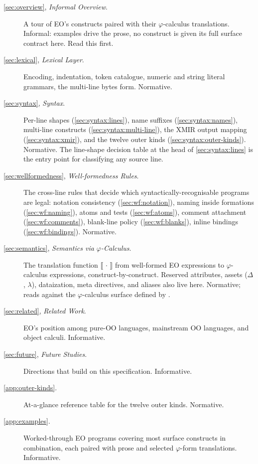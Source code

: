 \begin{description}
  \item[\cref{sec:overview}, \emph{Informal Overview}.]
    A tour of EO's constructs paired with their \(\varphi\)-calculus
    translations. Informal: examples drive the prose, no construct is
    given its full surface contract here. Read this first.
  \item[\cref{sec:lexical}, \emph{Lexical Layer}.]
    Encoding, indentation, token catalogue, numeric and string literal
    grammars, the multi-line bytes form. Normative.
  \item[\cref{sec:syntax}, \emph{Syntax}.]
    Per-line shapes (\cref{sec:syntax:lines}), name suffixes
    (\cref{sec:syntax:names}), multi-line constructs
    (\cref{sec:syntax:multi-line}), the XMIR output mapping
    (\cref{sec:syntax:xmir}), and the twelve outer kinds
    (\cref{sec:syntax:outer-kinds}). Normative.
    The line-shape decision table at the head of \cref{sec:syntax:lines}
    is the entry point for classifying any source line.
  \item[\cref{sec:wellformedness}, \emph{Well-formedness Rules}.]
    The cross-line rules that decide which syntactically-recognisable
    programs are legal: notation consistency
    (\cref{sec:wf:notation}), naming inside formations
    (\cref{sec:wf:naming}), atoms and tests (\cref{sec:wf:atoms}),
    comment attachment (\cref{sec:wf:comments}), blank-line policy
    (\cref{sec:wf:blanks}), inline bindings (\cref{sec:wf:bindings}).
    Normative.
  \item[\cref{sec:semantics}, \emph{Semantics via \(\varphi\)-Calculus}.]
    The translation function \(\llbracket\,\cdot\,\rrbracket\) from
    well-formed EO expressions to \(\varphi\)-calculus expressions,
    construct-by-construct.
    Reserved attributes, assets (\(\Delta\), \(\lambda\)),
    dataization, meta directives, and aliases also live here.
    Normative; reads against the \(\varphi\)-calculus surface defined
    by \citet{bugayenko2021eolang}.
  \item[\cref{sec:related}, \emph{Related Work}.]
    EO's position among pure-OO languages, mainstream OO languages, and
    object calculi. Informative.
  \item[\cref{sec:future}, \emph{Future Studies}.]
    Directions that build on this specification. Informative.
  \item[\cref{app:outer-kinds}.]
    At-a-glance reference table for the twelve outer kinds. Normative.
  \item[\cref{app:examples}.]
    Worked-through EO programs covering most surface constructs in
    combination, each paired with prose and selected \(\varphi\)-form
    translations. Informative.
\end{description}

